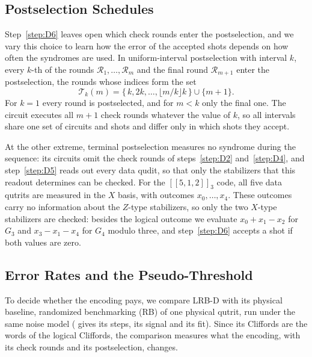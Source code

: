 \subsection{Postselection Schedules}
\label{sub:postselection_schedules}

Step~\ref{step:D6} leaves open which check rounds enter the postselection, and we vary this choice to learn how the error of the accepted shots depends on how often the syndromes are used. In uniform-interval postselection with interval $k$, every $k$-th of the rounds $\mathcal{R}_1, \dots, \mathcal{R}_m$ and the final round $\mathcal{R}_{m+1}$ enter the postselection, the rounds whose indices form the set
\begin{equation}
    \mathcal{T}_k(m) = \{\, k, 2k, \dots, \lfloor m/k \rfloor k \,\} \cup \{ m+1 \} .
    \label{eq:unif_rounds}
\end{equation}
For $k = 1$ every round is postselected, and for $m < k$ only the final one. The circuit executes all $m+1$ check rounds whatever the value of $k$, so all intervals share one set of circuits and shots and differ only in which shots they accept.

At the other extreme, terminal postselection measures no syndrome during the sequence: its circuits omit the check rounds of steps~\ref{step:D2} and~\ref{step:D4}, and step~\ref{step:D5} reads out every data qudit, so that only the stabilizers that this readout determines can be checked. For the $[[5,1,2]]_3$ code, all five data qutrits are measured in the $X$ basis, with outcomes $x_0, \dots, x_4$. These outcomes carry no information about the $Z$-type stabilizers, so only the two $X$-type stabilizers are checked: besides the logical outcome we evaluate $x_0 + x_1 - x_2$ for $G_3$ and $x_3 - x_1 - x_4$ for $G_4$ modulo three, and step~\ref{step:D6} accepts a shot if both values are zero.

\subsection{Error Rates and the Pseudo-Threshold}
\label{sub:fit_model}

To decide whether the encoding pays, we compare LRB-D with its physical baseline, randomized benchmarking (RB) of one physical qutrit, run under the same noise model ( gives its steps, its signal and its fit). Since its Cliffords are the words of the logical Cliffords, the comparison measures what the encoding, with its check rounds and its postselection, changes.

